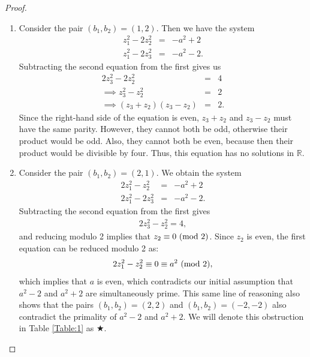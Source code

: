 \documentclass{article}
\newcommand{\R}{\mathbb{R}}
\theoremstyle{definition}
\begin{document}
\begin{proof}
\begin{enumerate}
    Subtracting the second equation from the first gives 
    \begin{eqnarray*}
        -z_2^2 - z_3^2 &=& 4,
    \end{eqnarray*}
    which has no solutions over $\R$. This same line of reasoning also shows that the pairs $(b_1,b_2) = (-1,2)$ and $(b_1,b_2) = (-2,1)$ have no solutions over $\R$.
    \item Consider the pair $(b_1,b_2) = (1,2)$. Then we have the system
    \begin{eqnarray*}
        z_1^2 - 2z_2^2 &=& -a^2 + 2 \\
        z_1^2 - 2z_3^2 &=& -a^2 - 2.
    \end{eqnarray*}
    Subtracting the second equation from the first gives us 
    \begin{eqnarray*}
        2z_3^2 - 2z_2^2 &=& 4 \\
        \implies z_3^2 - z_2^2 &=& 2 \\
        \implies (z_3+z_2)(z_3-z_2) &=& 2.
    \end{eqnarray*}
    Since the right-hand side of the equation is even, $z_3+z_2$ and $z_3-z_2$ must have the same parity. However, they cannot both be odd, otherwise their product would be odd. Also, they cannot both be even, because then their product would be divisible by four. Thus, this equation has no solutions in $\R$.
    \item Consider the pair $(b_1,b_2) = (2,1)$. We obtain the system
    \begin{eqnarray*}
        2z_1^2 - z_2^2 &=& -a^2 + 2 \\
        2z_1^2 - 2z_3^2 &=& -a^2 - 2.
    \end{eqnarray*}
    Subtracting the second equation from the first gives
    \begin{eqnarray*}
        2z_3^2 - z_2^2 = 4,
    \end{eqnarray*}
    and reducing modulo 2 implies that $z_2 \equiv 0 \textnormal{ (mod }2)$. Since $z_2$ is even, the first equation can be reduced modulo 2 as:
    \begin{eqnarray*}
        2z_1^2 - z_2^2 \equiv 0 \equiv a^2 \textnormal{ (mod }2),
    \end{eqnarray*}
    which implies that $a$ is even, which contradicts our initial assumption that $a^2-2$ and $a^2+2$ are simultaneously prime. This same line of reasoning also shows that the pairs $(b_1,b_2) = (2,2)$ and $(b_1,b_2) = (-2,-2)$ also contradict the primality of $a^2-2$ and $a^2+2$. We will denote this obstruction in Table \ref{Table:1} as $\bigstar$.

\end{enumerate}
\end{proof}
\end{document}
